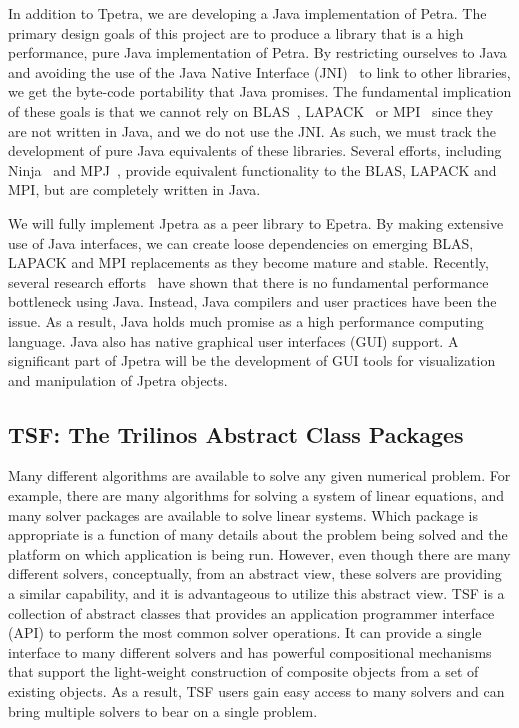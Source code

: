 \documentclass[12pt,relax]{TrilinosOverview}
\begin{document}
In addition to Tpetra, we are developing a Java implementation of Petra.  
The primary design goals of this project are to produce a library that 
is a high performance, pure Java implementation of Petra.  By restricting 
ourselves to Java and avoiding the use of the Java Native Interface 
(JNI)~\cite{JNI-site} to link to other libraries, we get the byte-code 
portability that Java promises.  The fundamental implication of these 
goals is that we cannot rely on BLAS~\cite{BLAS1,BLAS2,BLAS3}, 
LAPACK~\cite{lapack} or MPI~\cite{MPI} since they are not written in 
Java, and we do not use the JNI.  As such, we must track the development 
of pure Java equivalents of these libraries.  Several efforts, including 
Ninja~\cite{MoreMidkGuptArtiWuAlma2001} and 
MPJ~\cite{CarpGetoJuddSkjeFox2000}, provide equivalent functionality 
to the BLAS, LAPACK and MPI, but are completely written in Java.

We will fully implement Jpetra as a peer library to Epetra.  By making 
extensive use of Java interfaces, we can create loose dependencies on 
emerging BLAS, LAPACK and MPI replacements as they become mature and 
stable.  Recently, several research 
efforts~\cite{MoreMidkGuptArtiWuAlma2001,SCIMARK-site} have shown 
that there is no fundamental performance bottleneck using Java.  
Instead, Java compilers and user practices have been the issue.  
As a result, Java holds much promise as a high performance computing 
language.  Java also has native graphical user 
interfaces (GUI) support.  A significant part of Jpetra will be 
the development of GUI tools for visualization and manipulation of 
Jpetra objects.


\subsection{TSF: The Trilinos Abstract Class Packages}

Many different algorithms are available to solve any given numerical
problem.  For example, there are many algorithms for solving a system
of linear equations, and many solver packages are available to solve
linear systems.  Which package is appropriate is a function of
many details about the problem being solved and the platform on which
application is being run. However, even though
there are many different solvers, conceptually, from an abstract view,
these solvers are providing a similar capability, and it is
advantageous to utilize this abstract view.
TSF is a collection of abstract classes that provides an application
programmer interface (API) to perform the most common solver
operations.  It can provide a single interface to many different
solvers and has powerful compositional mechanisms that support the
light-weight construction of composite objects from a set of
existing objects.  As a result, TSF users gain easy access to many
solvers and can bring multiple solvers to bear on a single problem.
\end{document}
